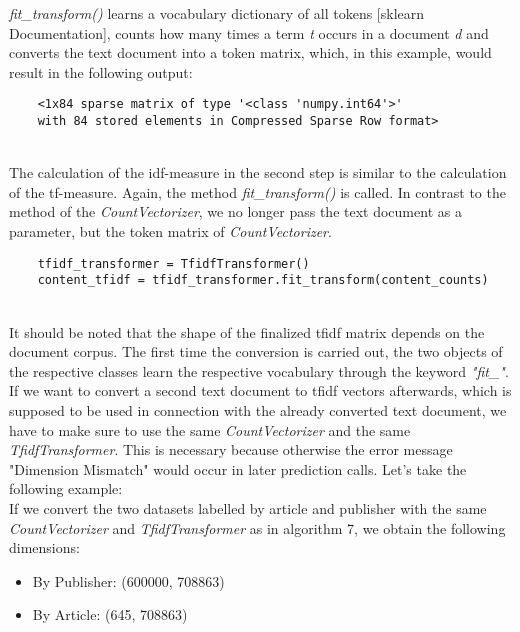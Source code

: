 \documentclass[a4paper, 11pt,titlepage,oneside,openany]{book}
\begin{document}
\noindent \textit{fit\_transform()} learns a vocabulary dictionary of all tokens [sklearn Documentation], counts how many times a term \textit{t} occurs in a document \textit{d} and converts the text document into a token matrix, which, in this example, would result in the following output: \\
\noindent
\begin{minipage}{\linewidth}
	\begin{lstlisting}
	<1x84 sparse matrix of type '<class 'numpy.int64'>'
	with 84 stored elements in Compressed Sparse Row format>
	\end{lstlisting}
\end{minipage} \\
\noindent The calculation of the \gls{idf}-measure in the second step is similar to the calculation of the \gls{tf}-measure. Again, the method \textit{fit\_transform()} is called. In contrast to the method of the \textit{CountVectorizer}, we no longer pass the text document as a parameter, but the token matrix of \textit{CountVectorizer}. \\
\noindent
\begin{minipage}{\linewidth}
	\begin{lstlisting}
	tfidf_transformer = TfidfTransformer()
	content_tfidf = tfidf_transformer.fit_transform(content_counts)
	\end{lstlisting}
\end{minipage} \\
\noindent It should be noted that the shape of the finalized \gls{tfidf} matrix depends on the document corpus. The first time the conversion is carried out, the two objects of the respective classes learn the respective vocabulary through the keyword \textit{"fit\_"}. If we want to convert a second text document to \gls{tfidf} vectors afterwards, which is supposed to be used in connection with the already converted text document, we have to make sure to use the same \textit{CountVectorizer} and the same \textit{TfidfTransformer}. This is necessary because otherwise the error message "Dimension Mismatch" would occur in later prediction calls.
Let's take the following example: \\
\noindent If we convert the two datasets labelled by article and publisher with the same \textit{CountVectorizer} and \textit{TfidfTransformer} as in algorithm 7, we obtain the following dimensions:
\begin{itemize}
	\item By Publisher: (600000, 708863)
	\item By Article: (645, 708863)	
\end{itemize}
\end{document}
